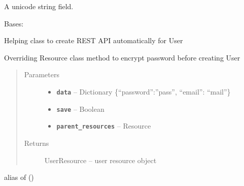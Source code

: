\documentclass[letterpaper,10pt,english]{sphinxmanual}
\begin{document}
\begin{fulllineitems}

\begin{fulllineitems}
\label{app:app.models.User.password}
A unicode string field.

\end{fulllineitems}


\end{fulllineitems}


\begin{fulllineitems}
\label{app:app.models.UserResource}
Bases: 

Helping class to create REST API automatically for User

\begin{fulllineitems}
\label{app:app.models.UserResource.create_object}
Overriding Resource class method to encrypt password before creating User
\begin{quote}\begin{description}
\item[{Parameters}] \leavevmode\begin{itemize}
\item {} 
\textbf{\texttt{data}} -- Dictionary \{``password'':''pass'', ``email'': ``mail''\}

\item {} 
\textbf{\texttt{save}} -- Boolean

\item {} 
\textbf{\texttt{parent\_resources}} -- Resource

\end{itemize}

\item[{Returns}] \leavevmode
UserResource -- user resource object

\end{description}\end{quote}

\end{fulllineitems}


\begin{fulllineitems}
\label{app:app.models.UserResource.document}
alias of {\hyperref[app:app.models.User]{\emph{}}} ()

\end{fulllineitems}


\end{fulllineitems}
\end{document}
